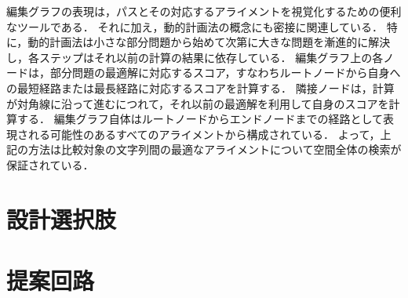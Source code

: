 編集グラフの表現は，パスとその対応するアライメントを視覚化するための便利なツールである．
それに加え，動的計画法の概念にも密接に関連している．
特に，動的計画法は小さな部分問題から始めて次第に大きな問題を漸進的に解決し，各ステップはそれ以前の計算の結果に依存している．
編集グラフ上の各ノードは，部分問題の最適解に対応するスコア，すなわちルートノードから自身への最短経路または最長経路に対応するスコアを計算する．
隣接ノードは，計算が対角線に沿って進むにつれて，それ以前の最適解を利用して自身のスコアを計算する．
編集グラフ自体はルートノードからエンドノードまでの経路として表現される可能性のあるすべてのアライメントから構成されている．
よって，上記の方法は比較対象の文字列間の最適なアライメントについて空間全体の検索が保証されている．

\section{設計選択肢}

\section{提案回路}

